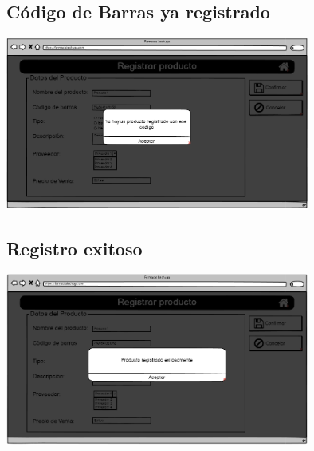 \begin{flushleft}
	\subsection{Código de Barras ya registrado} \label{Código de Barras ya registrado}
	\begin{center}
		\includegraphics[width=10cm]{pantallas/images/31mismocodigo.PNG}\\	
		 	
	\end{center}
	\subsection{Registro exitoso} \label{Registro exitoso}
	\begin{center}
		\includegraphics[width=10cm]{pantallas/images/32exito.PNG}\\	
		 	
	\end{center}
\end{flushleft}